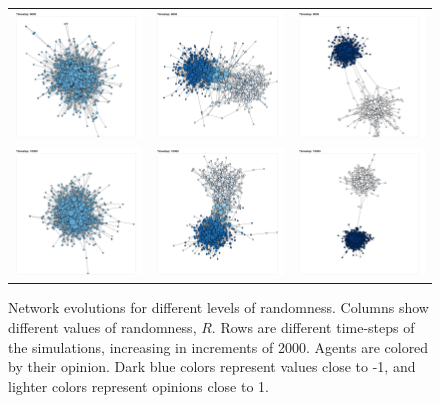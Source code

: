 \documentclass{article}
\begin{document}
\begin{center}
\begin{figure}[H]
\begin{tabular}{ccc}
    \includegraphics[width=.2\linewidth]{../plots/networks/network_example_R0.1_8000.png} & \includegraphics[width=.2\linewidth]{../plots/networks/network_example_R0.3_8000.png} & \includegraphics[width=.2\linewidth]{../plots/networks/network_example_R0.5_8000.png}\\  
    \includegraphics[width=.2\linewidth]{../plots/networks/network_example_R0.1_10000.png} & \includegraphics[width=.2\linewidth]{../plots/networks/network_example_R0.3_10000.png} & \includegraphics[width=.2\linewidth]{../plots/networks/network_example_R0.5_10000.png}\\  
    \end{tabular} 
    \caption{Network evolutions for different levels of randomness. Columns show different values of randomness, $R$. Rows are different time-steps of the simulations, increasing in increments of 2000. Agents are colored by their opinion. Dark blue colors represent values close to -1, and lighter colors represent opinions close to 1.} 
    \label{fig:networks} 
    \end{figure} 
\end{center} 
\end{document}
